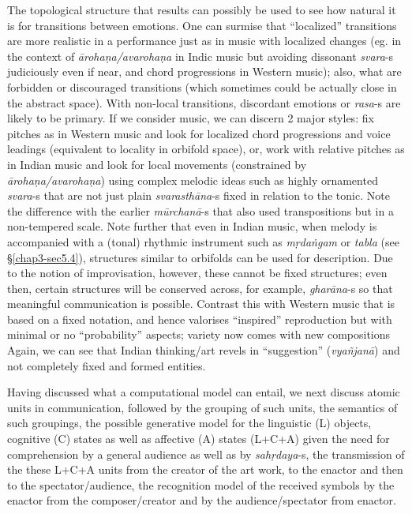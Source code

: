 The topological structure that results can possibly be used to see how natural it is for transitions between emotions. One can surmise that “localized” transitions are more realistic in a performance just as in music with localized changes (eg. in the context of \textsl{ārohaṇa/avarohaṇa} in Indic music but avoiding dissonant \textsl{svara}-s judiciously even if near, and chord progressions in Western music); also, what are forbidden or discouraged transitions (which sometimes could be actually close in the abstract space). With non-local transitions, discordant emotions or \textsl{rasa}-s are likely to be primary. If we consider music, we can discern 2 major styles: fix pitches as in Western music and look for localized chord progressions and voice leadings (equivalent to locality in orbifold space), or, work with relative pitches as in Indian music and look for local movements (constrained by \textsl{ārohaṇa/avarohaṇa}) using complex melodic ideas such as highly ornamented \textsl{svara}-s that are not just plain \textsl{svarasthāna}-s fixed in relation to the tonic. Note the difference with the earlier \textsl{mūrchanā}-s that also used transpositions but in a non-tempered scale. Note further that even in Indian music, when melody is accompanied with a (tonal) rhythmic instrument such as \textsl{mṛdaṅgam} or \textsl{tabla} (see \S\ref{chap3-sec5.4}), structures similar to orbifolds can be used for description. Due to the notion of improvisation, however, these cannot be fixed structures; even then, certain structures will be conserved across, for example, \textsl{gharāna}-s so that meaningful communication is possible. Contrast this with Western music that is based on a fixed notation, and hence valorises “inspired” reproduction but with minimal or no “probability” aspects; variety now comes with new compositions Again, we can see that Indian thinking/art revels in “suggestion” (\textsl{vyañjanā}) and not completely fixed and formed entities.

Having discussed what a computational model can entail, we next discuss atomic units in communication, followed by the grouping of such units, the semantics of such groupings, the possible generative model for the linguistic (L) objects, cognitive (C) states as well as affective (A) states (L+C+A) given the need for comprehension by a general audience as well as by \textsl{sahṛdaya}-s, the transmission of the these L+C+A units from the creator of the art work, to the enactor and then to the spectator/audience, the recognition model of the received symbols by the enactor from the composer/creator and by the audience/spectator from enactor.

